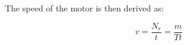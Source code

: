 \documentclass[journal,onecolumn]{IEEEtran}
\begin{document}
The speed of the motor is then derived as:

\begin{equation}
           \label{motor_speed}
           v = \frac{N_r}{t} = \frac{m}{T  t}
\end{equation}












\end{document}
